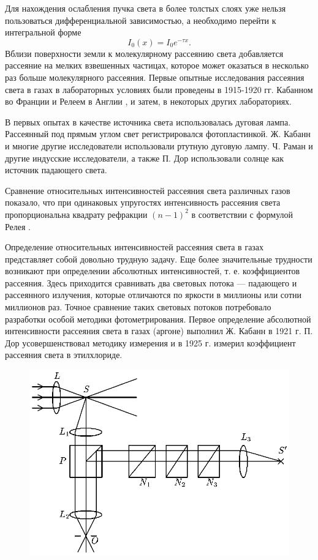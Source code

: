 Для нахождения ослабления пучка света в более толстых слоях уже
нельзя пользоваться дифференциальной зависимостью, а необходимо
перейти к интегральной форме
$$I_0(x)=I_0e^{-\tau x}.$$
Вблизи поверхности земли к молекулярному рассеянию света
добавляется рассеяние на мелких взвешенных частицах, которое
может оказаться в несколько раз больше молекулярного рассеяния.
Первые опытные исследования рассеяния света в газах в
лабораторных условиях были проведены в 1915-1920 гг. Кабанном во
Франции и Релеем в Англии 
, и затем, в некоторых
других лабораториях.

В первых опытах в качестве источника света использовалась дуговая
лампа. Рассеянный под прямым углом свет регистрировался
фотопластинкой. Ж. Кабанн и многие другие исследователи
использовали ртутную дуговую лампу. Ч. Раман и другие индусские
исследователи, а также П. Дор использовали солнце как источник
падающего света.

Сравнение относительных интенсивностей рассеяния света различных
газов показало, что при одинаковых упругостях интенсивность
рассеяния света пропорциональна квадрату рефракции $(n-1)^2$ в
соответствии с формулой Релея .

Определение относительных интенсивностей рассеяния света в газах
представляет собой довольно трудную задачу. Еще более
значительные трудности возникают при определении абсолютных
интенсивностей, т. е. коэффициентов рассеяния. Здесь приходится
сравнивать два световых потока --- падающего и рассеянного
излучения, которые отличаются по яркости в миллионы или сотни
миллионов раз. Точное сравнение таких световых потоков потребовало
разработки особой методики фотометрирования. Первое определение
абсолютной интенсивности рассеяния света в газах (аргоне)
выполнил Ж. Кабанн в 1921 г. П. Дор усовершенствовал
методику измерения и в 1925 г. измерил коэффициент рассеяния
света в этилхлориде.

\begin{figure}[tbp]
\centerline{\hbox{\includegraphics[scale=0.9]{Ris/ris_eps/ris4_1_14.eps}}}

\end{figure}

